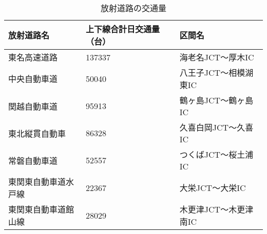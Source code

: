 \begin{table}[h!]
  \centering
  \renewcommand{\arraystretch}{1.2} %
  \begin{tabularx}{\textwidth}{p{}  p{} X}
  \toprule
  \textbf{放射道路名}     &\textbf{上下線合計日交通量（台）}         & \textbf{区間名}                         \\
  \midrule
  東名高速道路            &137337                               & 海老名JCT〜厚木IC   \\
  中央自動車道            &50040                                & 八王子JCT〜相模湖東IC \\
  関越自動車道            &95913                                & 鶴ヶ島JCT〜鶴ヶ島IC  \\
  東北縦貫自動車          &86328                                & 久喜白岡JCT〜久喜IC  \\
  常磐自動車道            &52557                                & つくばJCT〜桜土浦IC\\
  東関東自動車道水戸線     &22367                                & 大栄JCT〜大栄IC\\
  東関東自動車道館山線     &28029                                & 木更津JCT〜木更津南IC\\
  \bottomrule
  \end{tabularx}
  \caption{放射道路の交通量}
  \label{radiationroad_number}
  \end{table}
  

